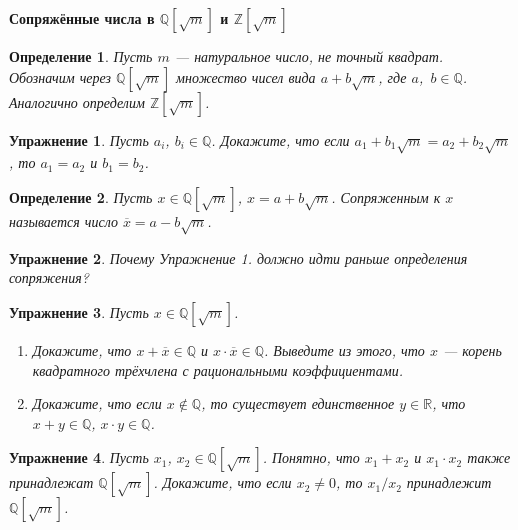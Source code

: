 \documentclass{article}
\newtheorem{definition}{Определение}
\newtheorem{exercise}{Упражнение}
\begin{document}
\large
	
\begin{center}
	\textbf{Сопряжённые числа в $\mathbb{Q}[\sqrt{m}]$ и $\mathbb{Z}[\sqrt{m}]$}
\end{center}


\begin{definition}
Пусть $m$ --- натуральное число, не точный квадрат. 
Обозначим через $\mathbb{Q}[\sqrt{m}]$ множество чисел вида 
$a+b\sqrt{m}$, где $a$,~$b\in \mathbb{Q}$. Аналогично определим $\mathbb{Z}[\sqrt{m}]$.
\end{definition}

\begin{exercise}
Пусть $a_i$, $b_i\in \mathbb{Q}$. 
Докажите, что если $a_1+b_1\sqrt{m}=a_2+b_2\sqrt{m}$, то $a_1=a_2$ и $b_1=b_2$. 
\end{exercise}

\begin{definition}
Пусть $x\in\mathbb{Q}[\sqrt{m}]$, $x=a+b\sqrt{m}$. Сопряженным к $x$
называется число $\overline{x}=a-b\sqrt{m}$.
\end{definition}

\begin{exercise}
Почему Упражнение 1. должно идти раньше определения сопряжения?
\end{exercise}

\begin{exercise}
Пусть $x\in \mathbb{Q}[\sqrt{m}]$. 
\begin{enumerate}[label*=\alph*)]
\item Докажите, что $x+\overline{x}\in \mathbb{Q}$ и $x\cdot \overline{x}\in\mathbb{Q}$. 
Выведите из этого, что $x$ --- корень квадратного трёхчлена с рациональными коэффициентами.
\item Докажите, что если $x\notin \mathbb{Q}$, то существует единственное $y\in \mathbb{R}$, что $x+y\in \mathbb{Q}$, $x\cdot y\in \mathbb{Q}$.
\end{enumerate}
\end{exercise}

\begin{exercise}
Пусть $x_1$, $x_2\in \mathbb{Q}[\sqrt{m}]$. Понятно, что $x_1+x_2$ и ${x_1\cdot x_2}$ также принадлежат
$\mathbb{Q}[\sqrt{m}]$. Докажите, что если $x_2\neq 0$, то $x_1/x_2$ принадлежит $\mathbb{Q}[\sqrt{m}]$.
\end{exercise}
\end{document}
